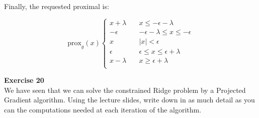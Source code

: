 \documentclass[11pt,table]{article}
\newenvironment{problem}[2][Exercise]
{ \begin{mdframed}[backgroundcolor=gray!20] \textbf{#1 #2} \\}
	{  \end{mdframed}}
\begin{document}
	Finally, the requested proximal is:
	
	\[
	\text{prox}_g(x) \begin{cases}
		x + \lambda \quad & x \le -\epsilon-\lambda \\
		-\epsilon \quad &  -\epsilon-\lambda \le x \le -\epsilon \\
		x \quad & |x| < \epsilon \\
		\epsilon \quad &  \epsilon \le x \le \epsilon+\lambda \\
		x-\lambda \quad & x \ge \epsilon+\lambda \\
	\end{cases}
	\]
	
	\begin{problem}{20}
		We have seen that we can solve the constrained Ridge problem by a Projected Gradient algorithm. Using the lecture slides, write down in as much detail as you can the computations needed at each iteration of the algorithm.
	\end{problem}
	
\end{document}
